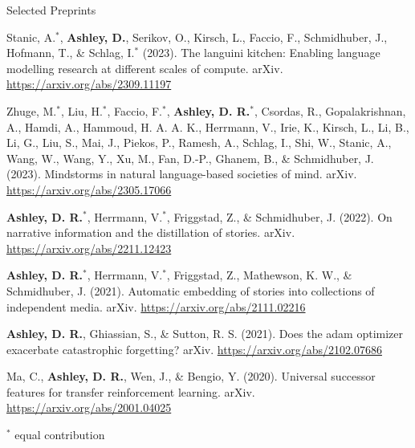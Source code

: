 \documentclass{cv}
\begin{document}

\begin{rSection}{Selected Preprints}

\begin{rPublications}
    \item Stanic, A.$^*$, \textbf{Ashley, D.}, Serikov, O., Kirsch, L., Faccio, F., Schmidhuber, J., Hofmann, T., \& Schlag, I.$^*$ (2023). The languini kitchen: Enabling language modelling research at different scales of compute. arXiv. \url{https://arxiv.org/abs/2309.11197}
    \item Zhuge, M.$^*$, Liu, H.$^*$, Faccio, F.$^*$, \textbf{Ashley, D. R.}$^*$, Csordas, R., Gopalakrishnan, A., Hamdi, A., Hammoud, H. A. A. K., Herrmann, V., Irie, K., Kirsch, L., Li, B., Li, G., Liu, S., Mai, J., Piekos, P., Ramesh, A., Schlag, I., Shi, W., Stanic, A., Wang, W., Wang, Y., Xu, M., Fan, D.-P., Ghanem, B., \& Schmidhuber, J. (2023). Mindstorms in natural language-based societies of mind. arXiv. \url{https://arxiv.org/abs/2305.17066}
    \item \textbf{Ashley, D. R.}$^*$, Herrmann, V.$^*$, Friggstad, Z., \& Schmidhuber, J. (2022). On narrative information and the distillation of stories. arXiv. \url{https://arxiv.org/abs/2211.12423}
    \item \textbf{Ashley, D. R.}$^*$, Herrmann, V.$^*$, Friggstad, Z., Mathewson, K. W., \& Schmidhuber, J. (2021). Automatic embedding of stories into collections of independent media. arXiv. \url{https://arxiv.org/abs/2111.02216}
    \item \textbf{Ashley, D. R.}, Ghiassian, S., \& Sutton, R. S. (2021). Does the adam optimizer exacerbate catastrophic forgetting? arXiv. \url{https://arxiv.org/abs/2102.07686}
    \item Ma, C., \textbf{Ashley, D. R.}, Wen, J., \& Bengio, Y. (2020). Universal successor features for transfer reinforcement learning. arXiv. \url{https://arxiv.org/abs/2001.04025}
\end{rPublications}

\hfill $^*$ \footnotesize{equal contribution} \vspace{-0.7em}

\end{rSection}

\end{document}
